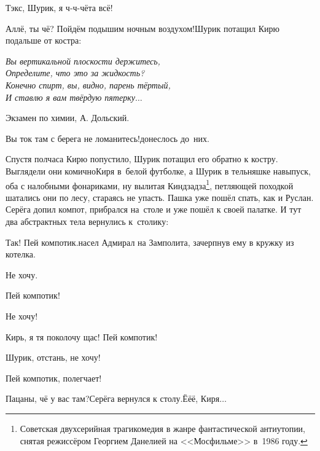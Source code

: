 \diagdash Тэк\sdash с, Шурик, я ч-ч-чёта всё!

\diagdash Аллё, ты чё? Пойдём подышим ночным воздухом!\mdash Шурик потащил Кирю подальше от костра:

\vspace{0.1cm}
\noindent\textit{%
	\hspace*{2.0cm}Вы вертикальной плоскости держитесь,\\	
	\hspace*{2.0cm}Определите, что это за жидкость?\\	
	\hspace*{2.0cm}Конечно спирт, вы, видно, парень тёртый,\\	
	\hspace*{2.0cm}И ставлю я вам твёрдую пятерку$\ldots$	
}

{\raggedleft \scriptsize \mdash Экзамен по химии, А. Дольский. \par}

\vspace{0.1cm}

\diagdash Вы ток там с берега не ломанитесь!\mdash донеслось до~них.

\renewcommand*{\thefootnote}{\fnsymbol{footnote}}
\setcounter{footnote}{0}
Спустя полчаса Кирю попустило, Шурик потащил его обратно к костру. Выглядели они комично\mdash Киря в~белой футболке, а Шурик в тельняшке навыпуск, оба с налобными фонариками, ну вылитая Кин\sdash дза\sdash дза\footnote{Советская двухсерийная трагикомедия в жанре фантастической антиутопии, снятая режиссёром Георгием Данелией на <<Мосфильме>> в~1986 году.}, петляющей походкой шатались они по лесу, стараясь не упасть. Пашка уже пошёл спать, как и Руслан. Серёга допил компот, прибрался на~столе и уже пошёл к своей палатке. И тут два абстрактных тела вернулись к~столику:

\diagdash Так! Пей компотик.\mdash насел Адмирал на Замполита, зачерпнув ему в кружку из котелка.

\diagdash Не хочу.

\diagdash Пей компотик!

\diagdash Не хочу!

\diagdash Кирь, я тя поколочу щас! Пей компотик!

\diagdash Шурик, отстань, не хочу!

\diagdash Пей компотик, полегчает!

\diagdash Пацаны, чё у вас там?\mdash Серёга вернулся к столу.\mdash Ё\sdash ё\sdash ё, Киря$\ldots$

